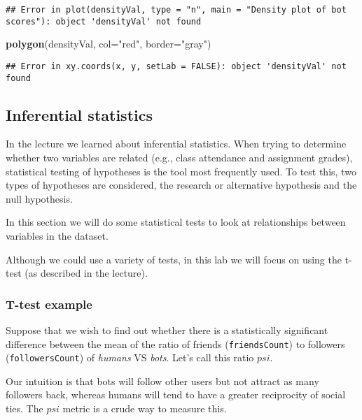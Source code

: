 \documentclass[]{article}
\newenvironment{Shaded}{\begin{snugshade}}{\end{snugshade}}
\newcommand{\DataTypeTok}[1]{\textcolor[rgb]{0.13,0.29,0.53}{#1}}
\newcommand{\KeywordTok}[1]{\textcolor[rgb]{0.13,0.29,0.53}{\textbf{#1}}}
\newcommand{\NormalTok}[1]{#1}
\newcommand{\StringTok}[1]{\textcolor[rgb]{0.31,0.60,0.02}{#1}}
\begin{document}
\begin{verbatim}
## Error in plot(densityVal, type = "n", main = "Density plot of bot scores"): object 'densityVal' not found
\end{verbatim}

\begin{Shaded}
\begin{Highlighting}[]
\KeywordTok{polygon}\NormalTok{(densityVal, }\DataTypeTok{col=}\StringTok{"red"}\NormalTok{, }\DataTypeTok{border=}\StringTok{"gray"}\NormalTok{)}
\end{Highlighting}
\end{Shaded}

\begin{verbatim}
## Error in xy.coords(x, y, setLab = FALSE): object 'densityVal' not found
\end{verbatim}

\hypertarget{inferential-statistics}{%
\subsection{Inferential statistics}\label{inferential-statistics}}

In the lecture we learned about inferential statistics. When trying to
determine whether two variables are related (e.g., class attendance and
assignment grades), statistical testing of hypotheses is the tool most
frequently used. To test this, two types of hypotheses are considered,
the research or alternative hypothesis and the null hypothesis.

In this section we will do some statistical tests to look at
relationships between variables in the dataset.

Although we could use a variety of tests, in this lab we will focus on
using the t-test (as described in the lecture).

\hypertarget{t-test-example}{%
\subsubsection{T-test example}\label{t-test-example}}

Suppose that we wish to find out whether there is a statistically
significant difference between the mean of the ratio of friends
(\texttt{friendsCount}) to followers (\texttt{followersCount}) of
\emph{humans} VS \emph{bots}. Let's call this ratio \(psi\).

Our intuition is that bots will follow other users but not attract as
many followers back, whereas humans will tend to have a greater
reciprocity of social ties. The \(psi\) metric is a crude way to measure
this.
\end{document}
